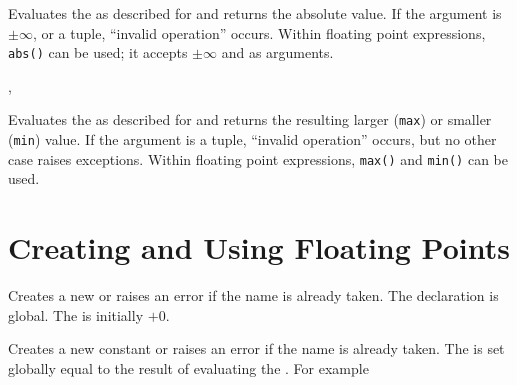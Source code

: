 \documentclass[oneside]{book}
\begin{document}
\begin{function}{\FpMathAbs}
\begin{syntax}
 
\end{syntax}
Evaluates the  as described for
 and returns the absolute value.
If the argument is $\pm\infty$, \nan{} or a tuple,
\enquote{invalid operation} occurs.  Within floating point
expressions, \verb|abs()| can be used; it accepts $\pm\infty$ and \nan{}
as arguments.
\end{function}

\begin{function}{\FpMathMax,\FpMathMin}
\begin{syntax}
  
  
\end{syntax}
Evaluates the  as described for 
and returns the resulting larger (\texttt{max}) or smaller (\texttt{min}) value.
If the argument is a tuple, \enquote{invalid operation} occurs,
but no other case raises exceptions. Within floating point expressions,
\verb|max()| and \verb|min()| can be used.
\end{function}

\section{Creating and Using Floating Points}

\begin{function}{\FpNew}
\begin{syntax}
 
\end{syntax}
Creates a new  or raises an error if the name is
already taken. The declaration is global. The  is
initially $+0$.
\end{function}

\begin{function}{\FpConst}
\begin{syntax}
  
\end{syntax}
Creates a new constant  or raises an error if the name
is already taken. The  is set globally equal to
the result of evaluating the .
For example
\begin{demohigh}
\FpConst {}
\FpUse \cMyPiFp
\end{demohigh}
\end{function}
\end{document}
